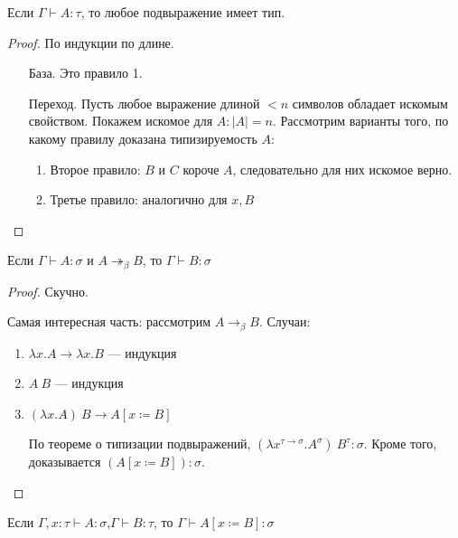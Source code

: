 \begin{theorem}
    Если \(\Gamma \vdash A : \tau\), то любое подвыражение имеет тип.
\end{theorem}
\begin{proof}
    По индукции по длине.

    \begin{itemize}
        \item [База.] Это правило 1.
        \item [Переход.] Пусть любое выражение длиной \( < n\) символов обладает искомым свойством. Покажем искомое для \(A : |A| = n\). Рассмотрим варианты того, по какому правилу доказана типизируемость \(A\):
              \begin{enumerate}
                  \item Второе правило: \(B\) и \(C\) короче \(A\), следовательно для них искомое верно.
                  \item Третье правило: аналогично для \(x, B\)
              \end{enumerate}
    \end{itemize}
\end{proof}

\begin{theorem}
    Если \(\Gamma \vdash A : \sigma\) и \(A \twoheadrightarrow_\beta B\), то \(\Gamma \vdash B : \sigma\)
\end{theorem}
\begin{proof}
    Скучно.

    Самая интересная часть: рассмотрим \(A \to_\beta B\). Случаи:
    \begin{enumerate}
        \item \(\lambda x.A \to \lambda x.B\) --- индукция
        \item \(A\ B\) --- индукция
        \item \((\lambda x.A)\ B \to A[x \coloneqq B]\)

              По теореме о типизации подвыражений, \((\lambda x^{\tau \to \sigma}.A^\sigma)\ B^\tau : \sigma\). Кроме того, доказывается \((A [x \coloneqq B]) : \sigma\).
    \end{enumerate}
\end{proof}

\begin{lemma}
    Если \(\Gamma, x : \tau \vdash A : \sigma\),\(\Gamma \vdash B : \tau\), то \(\Gamma \vdash A[x \coloneqq B] : \sigma\)
\end{lemma}

